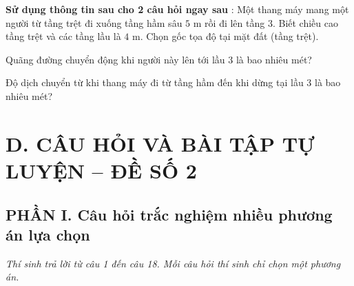 \noindent\textbf{Sử dụng thông tin sau cho 2 câu hỏi ngay sau} : Một thang máy mang một người từ tầng trệt đi xuống tầng hầm sâu $5\text{ m}$ rồi đi lên tầng 3. Biết chiều cao tầng trệt và các tầng lầu là $4\text{ m}$. Chọn gốc tọa độ tại mặt đất (tầng trệt).

\begin{ex} Quãng đường chuyển động khi người này lên tới lầu 3 là bao nhiêu mét?

\par{}
\end{ex}

\begin{ex} Độ dịch chuyển từ khi thang máy đi từ tầng hầm đến khi dừng tại lầu 3 là bao nhiêu mét?

\par{}
\end{ex}


\section*{D. CÂU HỎI VÀ BÀI TẬP TỰ LUYỆN -- ĐỀ SỐ 2}

\setcounter{ex}{0}
\subsection*{PHẦN I. Câu hỏi trắc nghiệm nhiều phương án lựa chọn}
\textit{Thí sinh trả lời từ câu 1 đến câu 18. Mỗi câu hỏi thí sinh chỉ chọn một phương án.}

